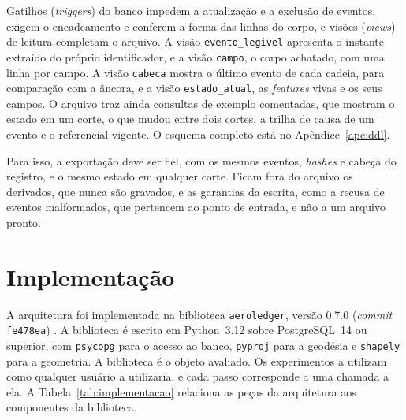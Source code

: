 Gatilhos (\textit{triggers}) do banco impedem a atualização e a exclusão de eventos, exigem o encadeamento e conferem a forma das linhas do corpo, e visões (\textit{views}) de leitura completam o arquivo. A visão \texttt{evento\_legivel} apresenta o instante extraído do próprio identificador, e a visão \texttt{campo}, o corpo achatado, com uma linha por campo. A visão \texttt{cabeca} mostra o último evento de cada cadeia, para comparação com a âncora, e a visão \texttt{estado\_atual}, as \textit{features} vivas e os seus campos. O arquivo traz ainda consultas de exemplo comentadas, que mostram o estado em um corte, o que mudou entre dois cortes, a trilha de causa de um evento e o referencial vigente. O esquema completo está no Apêndice~\ref{ape:ddl}.

Para isso, a exportação deve ser fiel, com os mesmos eventos, \textit{hashes} e cabeça do registro, e o mesmo estado em qualquer corte. Ficam fora do arquivo os derivados, que nunca são gravados, e as garantias da escrita, como a recusa de eventos malformados, que pertencem ao ponto de entrada, e não a um arquivo pronto.



\section{Implementação}\label{sec:implementacao}

A arquitetura foi implementada na biblioteca \texttt{aeroledger}, versão 0.7.0 (\textit{commit} \texttt{fe478ea}) \cite{aeroledger}. A biblioteca é escrita em Python~3.12 sobre PostgreSQL~14 ou superior, com \texttt{psycopg} para o acesso ao banco, \texttt{pyproj} para a geodésia e \texttt{shapely} para a geometria. A biblioteca é o objeto avaliado. Os experimentos a utilizam como qualquer usuário a utilizaria, e cada passo corresponde a uma chamada a ela. A Tabela~\ref{tab:implementacao} relaciona as peças da arquitetura aos componentes da biblioteca.

